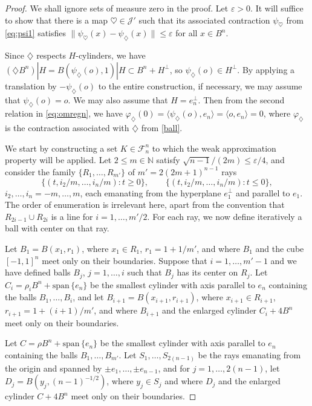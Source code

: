 \documentclass[12pt,reqno]{amsart}
\newcommand{\ee}{\varepsilon}
\newcommand{\N}{{\mathbb N}}
\newcommand{\cF}{\mathcal F}
\newcommand{\cJ}{\mathcal J}
\newcommand{\myspan}{{\mathrm{span}}\,}
\newcommand{\di}{\diamondsuit}
\numberwithin{equation}{section}
\begin{document}
\begin{proof}
We shall ignore sets of measure zero in the proof. Let $\ee>0$. It will suffice to show that there is a map $\heartsuit\in\cJ'$ such that its associated contraction $\psi_{\heartsuit}$ from \eqref{eq:psi1} satisfies $\|\psi_{\heartsuit}(x)-\psi_\di(x)\|\le \ee$ for all $x\in B^n$.

Since $\di$ respects $H$-cylinders, we have $(\di B^n)|H=
B(\psi_\di(o),1)|H\subset B^n+H^{\perp}$, so $\psi_\di(o)\in H^\perp$. By applying a translation by $-\psi_\di(o)$ to the entire construction, if necessary, we may assume that $\psi_\di(o)=o$. We may also assume that $H=e_n^\perp$.  Then from the second relation in \eqref{eq:omregn}, we have $\varphi_{\di}(0)=\langle \psi_{\di}(o),e_n\rangle=\langle o,e_n\rangle=0$, where $\varphi_{\di}$ is the contraction associated with $\di$ from \eqref{ball}.

We start by constructing a set $K\in \cF_n^n$ to which the weak approximation property will be applied. Let $2\le m\in \N$ satisfy $\sqrt{n-1}/(2m)\le \ee/4$, and consider the family $\{R_1,\ldots,R_{m'}\}$ of $m'=2(2m+1)^{n-1}$ rays
\[
\{(t,i_2/m,\ldots,i_n/m):t\ge 0\},\qquad
\{(t,i_2/m,\ldots,i_n/m):t\le 0\},
\]
$i_2,\ldots,i_n=-m,\dots,m$, each emanating from the hyperplane $e_1^{\perp}$ and parallel to $e_1$.  The order of enumeration is irrelevant here, apart from the convention that $R_{2i-1}\cup R_{2i}$ is a line for $i=1,\dots,m'/2$. For each ray, we now define iteratively a ball with center on that ray.

Let $B_{1}=B(x_1,r_1)$, where $x_1\in R_1$, $r_1=1+1/m'$, and where $B_{1}$ and the cube $[-1,1]^n$ meet only on their boundaries.  Suppose that $i=1,\dots,m'-1$ and we have defined balls $B_j$, $j=1,\dots,i$ such that $B_j$ has its center on $R_j$.  Let $C_i=\rho_i B^n+\myspan\{e_n\}$ be the smallest cylinder with axis parallel to $e_n$ containing the balls $B_1,\dots,B_i$, and let $B_{i+1}=B(x_{i+1},r_{i+1})$, where $x_{i+1}\in R_{i+1}$, $r_{i+1}=1+(i+1)/m'$, and where $B_{i+1}$ and the enlarged cylinder $C_i+4B^n$ meet only on their boundaries.

Let $C=\rho B^n+\myspan\{e_n\}$ be the smallest cylinder with axis parallel to $e_n$ containing the balls $B_1,\dots,B_{m'}$. Let $S_1,\dots,S_{2(n-1)}$ be the rays emanating from the origin and spanned by $\pm e_1,\dots,\pm e_{n-1}$, and for $j=1,\dots,2(n-1)$, let $D_j=B(y_j,(n-1)^{-1/2})$, where $y_j\in S_j$ and where $D_j$ and the enlarged cylinder $C+4B^n$ meet only on their boundaries.


\end{proof}
\end{document}
